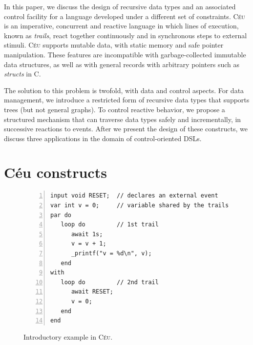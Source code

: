 \documentclass{sig-alternate}
\newcommand{\CEU}{\textsc{C\'{e}u}\xspace}
\newcommand{\code}[1] {{\small{\texttt{#1}}}}
\begin{document}
In this paper, we discuss the design of recursive data types and an associated
control facility for a language developed under a different set of
constraints.
\CEU~\cite{ceu.sensys13,ceu.mod15} is an imperative, concurrent and reactive 
language in which lines of execution, known as \emph{trails}, react 
together continuously and in synchronous steps to external stimuli.
\CEU supports mutable data, with static memory and safe pointer 
manipulation.
These features are incompatible with garbage-collected immutable data 
structures, as well as with general records with arbitrary pointers such as 
\emph{structs} in C.

The solution to this problem is twofold, with data and control aspects.
For data management, we introduce a restricted form of recursive data types 
that supports trees (but not general graphs).
To control reactive behavior, we propose a structured mechanism that can 
traverse data types safely and incrementally, in successive reactions to 
events.
%
After we present the design of these constructs, we discuss three applications 
in the domain of control-oriented DSLs.

\section{C\'eu constructs}
\label{sec.ceu}

\begin{figure}[t]
\begin{lstlisting}[numbers=left,xleftmargin=3em]
input void RESET;  // declares an external event
var int v = 0;     // variable shared by the trails
par do
   loop do         // 1st trail
      await 1s;
      v = v + 1;
      _printf("v = %d\n", v);
   end
with
   loop do         // 2nd trail
      await RESET;
      v = 0;
   end
end
\end{lstlisting}
\caption{ Introductory example in \CEU.
\label{lst.intro}
}
\end{figure}
\end{document}

